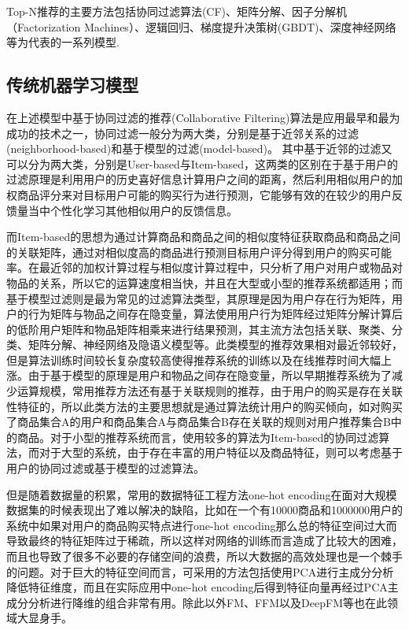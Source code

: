 Top-N推荐的主要方法包括协同过滤算法(CF)、矩阵分解、因子分解机（Factorization Machines）、逻辑回归、梯度提升决策树(GBDT)、深度神经网络等为代表的一系列模型.

\subsection{传统机器学习模型}

在上述模型中基于协同过滤的推荐(Collaborative Filtering)算法是应用最早和最为成功的技术之一，协同过滤一般分为两大类，分别是基于近邻关系的过滤(neighborhood-based)和基于模型的过滤(model-based)。
其中基于近邻的过滤又可以分为两大类，分别是User-based与Item-based，这两类的区别在于基于用户的过滤原理是利用用户的历史喜好信息计算用户之间的距离，然后利用相似用户的加权商品评分来对目标用户可能的购买行为进行预测，它能够有效的在较少的用户反馈量当中个性化学习其他相似用户的反馈信息\cite{姜保庆2014基于社交网络的一种个性化推荐算法}。

而Item-based的思想为通过计算商品和商品之间的相似度特征获取商品和商品之间的关联矩阵，通过对相似度高的商品进行预测目标用户评分得到用户的购买可能率。在最近邻的加权计算过程与相似度计算过程中，只分析了用户对用户或物品对物品的关系，所以它的运算速度相当快，并且在大型或小型的推荐系统都适用；而基于模型过滤则是最为常见的过滤算法类型，其原理是因为用户存在行为矩阵，用户的行为矩阵与物品之间存在隐变量，算法使用用户行为矩阵经过矩阵分解计算后的低阶用户矩阵和物品矩阵相乘来进行结果预测，其主流方法包括关联、聚类、分类、矩阵分解、神经网络及隐语义模型等。此类模型的推荐效果相对最近邻较好，但是算法训练时间较长复杂度较高使得推荐系统的训练以及在线推荐时间大幅上涨。由于基于模型的原理是用户和物品之间存在隐变量，所以早期推荐系统为了减少运算规模，常用推荐方法还有基于关联规则的推荐，由于用户的购买是存在关联性特征的，所以此类方法的主要思想就是通过算法统计用户的购买倾向，如对购买了商品集合A的用户和商品集合A与商品集合B存在关联的规则对用户推荐集合B中的商品。对于小型的推荐系统而言，使用较多的算法为Item-based的协同过滤算法，而对于大型的系统，由于存在丰富的用户特征以及商品特征，则可以考虑基于用户的协同过滤或基于模型的过滤算法。

但是随着数据量的积累，常用的数据特征工程方法one-hot encoding在面对大规模数据集的时候表现出了难以解决的缺陷，比如在一个有10000商品和1000000用户的系统中如果对用户的商品购买特点进行one-hot encoding那么总的特征空间过大而导致最终的特征矩阵过于稀疏，所以这样对网络的训练而言造成了比较大的困难，而且也导致了很多不必要的存储空间的浪费，所以大数据的高效处理也是一个棘手的问题。对于巨大的特征空间而言，可采用的方法包括使用PCA进行主成分分析降低特征维度，而且在实际应用中one-hot encoding后得到特征向量再经过PCA主成分分析进行降维的组合非常有用。除此以外FM、FFM以及DeepFM等也在此领域大显身手。

